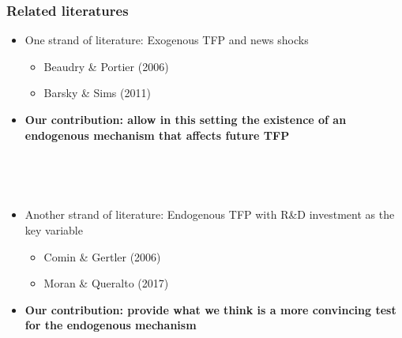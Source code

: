 \documentclass{beamer}
\begin{document}
\begin{frame}
	\frametitle{Related literatures}
	\label{related_lit}
\begin{itemize}
\item One strand of literature: Exogenous TFP and news shocks
	\begin{itemize}
	\item Beaudry \& Portier (2006)
	\item Barsky \& Sims (2011)
	
	\end{itemize}
\item [] \textbf{Our contribution: allow in this setting the existence of an endogenous mechanism that affects future TFP}	


\hyperlink{BS_quote}{}

	\
	
	\
	
\item Another strand of literature: Endogenous TFP with R\&D investment as the key variable
	\begin{itemize}
	\item Comin \& Gertler (2006)
	\item Moran \& Queralto (2017)
	
	\end{itemize}	


\item []  \textbf{Our contribution: provide what we think is a more convincing test for the endogenous mechanism}


\end{itemize}



\end{frame}
\end{document}
